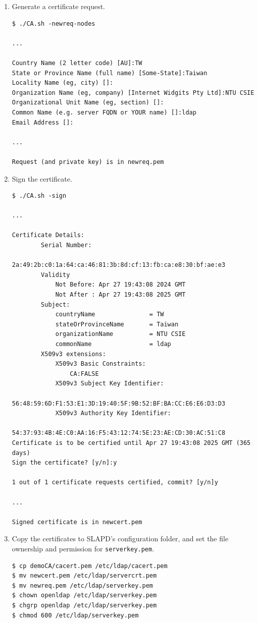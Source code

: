 \documentclass[12pt, a4paper]{article}
\begin{document}
\begin{enumerate}[label=(\alph*)]
\begin{enumerate}[label=(\arabic*)]
      \pagebreak
      \item Generate a certificate request.
      \begin{Verbatim}[frame=single, fontsize=\footnotesize]
$ ./CA.sh -newreq-nodes

...

Country Name (2 letter code) [AU]:TW
State or Province Name (full name) [Some-State]:Taiwan
Locality Name (eg, city) []:
Organization Name (eg, company) [Internet Widgits Pty Ltd]:NTU CSIE
Organizational Unit Name (eg, section) []:
Common Name (e.g. server FQDN or YOUR name) []:ldap
Email Address []:

...

Request (and private key) is in newreq.pem
      \end{Verbatim}

      \item Sign the certificate.
      \begin{Verbatim}[frame=single, fontsize=\footnotesize]
$ ./CA.sh -sign

...

Certificate Details:
        Serial Number:
            2a:49:2b:c0:1a:64:ca:46:81:3b:8d:cf:13:fb:ca:e8:30:bf:ae:e3
        Validity
            Not Before: Apr 27 19:43:08 2024 GMT
            Not After : Apr 27 19:43:08 2025 GMT
        Subject:
            countryName               = TW
            stateOrProvinceName       = Taiwan
            organizationName          = NTU CSIE
            commonName                = ldap
        X509v3 extensions:
            X509v3 Basic Constraints:
                CA:FALSE
            X509v3 Subject Key Identifier:
                56:48:59:6D:F1:53:E1:3D:19:40:5F:9B:52:BF:BA:CC:E6:E6:D3:D3
            X509v3 Authority Key Identifier:
                54:37:93:4B:4E:C0:AA:16:F5:43:12:74:5E:23:AE:CD:30:AC:51:C8
Certificate is to be certified until Apr 27 19:43:08 2025 GMT (365 days)
Sign the certificate? [y/n]:y

1 out of 1 certificate requests certified, commit? [y/n]y

...

Signed certificate is in newcert.pem
      \end{Verbatim}

      \item Copy the certificates to SLAPD's configuration folder, and set the
      file ownership and permission for \verb|serverkey.pem|.
      \begin{Verbatim}[frame=single]
$ cp demoCA/cacert.pem /etc/ldap/cacert.pem
$ mv newcert.pem /etc/ldap/servercrt.pem
$ mv newreq.pem /etc/ldap/serverkey.pem
$ chown openldap /etc/ldap/serverkey.pem
$ chgrp openldap /etc/ldap/serverkey.pem
$ chmod 600 /etc/ldap/serverkey.pem
      \end{Verbatim}


\end{enumerate}
\end{enumerate}
\end{document}
